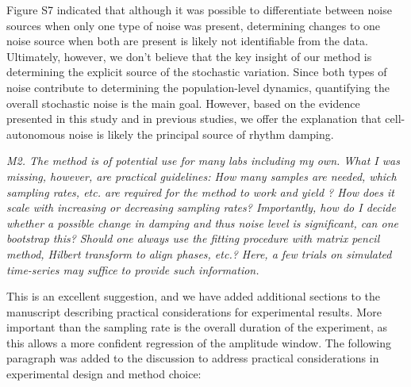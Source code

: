 \documentclass[11pt, letterpaper]{article}
\newenvironment{reviewer}{\itshape\color{gray}}{}
\begin{document}
Figure S7 indicated that although it was possible to differentiate between noise sources when only one type of noise was present, determining changes to one noise source when both are present is likely not identifiable from the data.
Ultimately, however, we don't believe that the key insight of our method is determining the explicit source of the stochastic variation.
Since both types of noise contribute to determining the population-level dynamics, quantifying the overall stochastic noise is the main goal.
However, based on the evidence presented in this study and in previous studies, we offer the explanation that cell-autonomous noise is likely the principal source of rhythm damping.

\begin{reviewer}
M2. The method is of potential use for many labs including my own. What I was missing, however, are practical guidelines: How many samples are needed, which sampling rates, etc. are required for the method to work and yield ? How does it scale with increasing or decreasing sampling rates? Importantly, how do I decide whether a possible change in damping and thus noise level is significant, can one bootstrap this? Should one always use the fitting procedure with matrix pencil method, Hilbert transform to align phases, etc.? Here, a few trials on simulated time-series may suffice to provide such information.
\end{reviewer}

This is an excellent suggestion, and we have added additional sections to the manuscript describing practical considerations for experimental results.
More important than the sampling rate is the overall duration of the experiment, as this allows a more confident regression of the amplitude window.
The following paragraph was added to the discussion to address practical considerations in experimental design and method choice:
\end{document}
